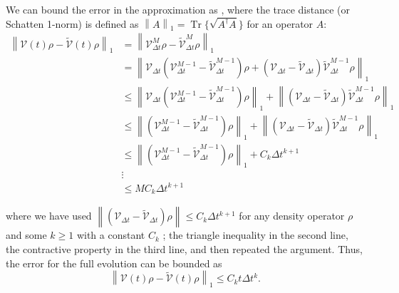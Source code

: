 \documentclass[11pt]{article}
\newcommand{\calV}{\mathcal{V}}
\newcommand{\Dt}{\Delta t}
\newcommand{\norm}[1]{\left\lVert #1 \right\rVert}
\DeclareMathOperator{\Tr}{Tr}
\begin{document}
We can bound the error in the approximation as 
, where the trace distance (or Schatten 1-norm) is defined as 
$\norm{A}_1=\Tr\{\sqrt{A^\dagger A}\}$ for an operator $A$:
\begin{align}
    \norm{\calV\left(t\right)\rho - \tilde{\calV}\left(t\right)\rho}_1 &= \norm{\calV^M_{\Dt} \rho - \tilde{\calV}^M_{\Dt} \rho}_1\\
    &= \norm{\calV_{\Dt}\left(\calV^{M-1}_{\Dt}-\tilde{\calV}^{M-1}_{\Dt}\right) \rho + \left(\calV_{\Dt}-\tilde{\calV}_{\Dt}\right)\tilde{\calV}^{M-1}_{\Dt} \rho}_1\\
    &\leq \norm{\calV_{\Dt}\left(\calV^{M-1}_{\Dt}-\tilde{\calV}^{M-1}_{\Dt}\right) \rho}_1 + \norm{\left(\calV_{\Dt}-\tilde{\calV}_{\Dt}\right)\tilde{\calV}^{M-1}_{\Dt} \rho}_1\\
    &\leq \norm{\left(\calV^{M-1}_{\Dt}-\tilde{\calV}^{M-1}_{\Dt}\right) \rho}_1 + \norm{\left(\calV_{\Dt}-\tilde{\calV}_{\Dt}\right)\tilde{\calV}^{M-1}_{\Dt} \rho}_1\\
    &\le \norm{\left(\calV^{M-1}_{\Dt}-\tilde{\calV}^{M-1}_{\Dt}\right) \rho}_1+C_{k}\Dt^{k+1}\\
    &\vdots\\
    &\leq M C_{k}\Dt^{k+1}
\end{align}



where we have used $\norm{\left(\calV_{\Dt}-\tilde{\calV}_{\Dt}\right)\rho}\le C_{k} \Dt^{k+1}$ for any density operator $\rho$ and some $k\ge 1$ with a constant $C_{k}$ \cite{Ding2024}; the triangle inequality in the second line, the contractive property in the third line, and then repeated the argument. Thus, the error for the full evolution can be bounded as
\begin{equation}\label{eq:fullEvo_error}
    \norm{\calV\left(t\right)\rho - \tilde{\calV}\left(t\right)\rho}_1 \leq C_k t \Dt^k. 
\end{equation}
\end{document}
